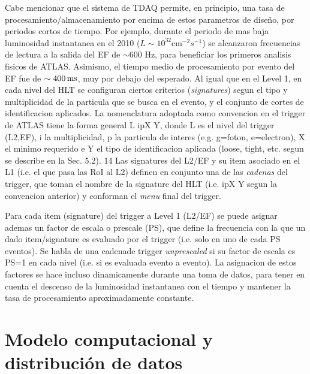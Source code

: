 Cabe mencionar que el sistema de TDAQ permite, en principio, una tasa de
procesamiento/almacenamiento por encima de estos parametros de dise\~no, por
periodos cortos de tiempo. Por ejemplo, durante el periodo de mas baja
luminosidad instantanea en el 2010 ($L\sim 10^{32} \text{cm}^{-2} s^{-1}$) se
alcanzaron frecuencias de lectura a la salida del EF de $\sim 600$ Hz, para
beneficiar los primeros analisis fisicos de ATLAS. Asimismo, el tiempo medio de
procesamiento por evento del EF fue de $\sim \unit[400]{ms}$, muy por debajo del
esperado. Al igual que en el Level 1, en cada nivel del HLT se configuran
ciertos criterios (\emph{signatures}) segun el tipo y multiplicidad de la
particula que se busca en el evento, y el conjunto de cortes de identificacion
aplicados. La nomenclatura adoptada como convencion en el trigger de ATLAS tiene
la forma general L ipX Y, donde L es el nivel del trigger (L2,EF), i la
multiplicidad, p la particula de interes (e.g. g=foton, e=electron), X el {\pt}
minimo requerido e Y el tipo de identificacion aplicada (loose, tight, etc.
segun se describe en la Sec. 5.2). 14 Las signatures del L2/EF y su item
asociado en el L1 (i.e. el que pasa las RoI al L2) definen en conjunto una de
las \emph{cadenas} del trigger, que toman el nombre de la signature del HLT
(i.e. ipX Y segun la convencion anterior) y conforman el \emph{menu} final del
trigger.


Para cada item (signature) del trigger a Level 1 (L2/EF) se puede asignar ademas
un factor de escala o prescale (PS), que define la frecuencia con la que un dado
item/signature es evaluado por el trigger (i.e. solo en uno de cada PS eventos).
Se habla de una cadenade trigger \emph{unprescaled} si su factor de escala es
PS=1 en cada nivel (i.e. si es evaluada evento a evento). La asignacion de estos
factores se hace incluso dinamicamente durante una toma de datos, para tener en
cuenta el descenso de la luminosidad instantanea con el tiempo y mantener la
tasa de procesamiento aproximadamente constante.


\section{Modelo computacional y distribución de datos}


